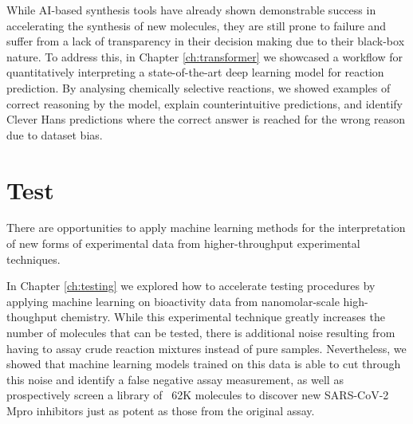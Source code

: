 


While AI-based synthesis tools have already shown demonstrable success in accelerating the synthesis of new molecules, they are still prone to failure and suffer from a lack of transparency in their decision making due to their black-box nature. To address this, in Chapter \ref{ch:transformer} we showcased a workflow for quantitatively interpreting a state-of-the-art deep learning model for reaction prediction. By analysing chemically selective reactions, we showed examples of correct reasoning by the model, explain counterintuitive predictions, and identify Clever Hans predictions where the correct answer is reached for the wrong reason due to dataset bias.

\section*{Test}

There are opportunities to apply machine learning methods for the interpretation of new forms of experimental data from higher-throughput experimental techniques.

In Chapter \ref{ch:testing} we explored how to accelerate testing procedures by applying machine learning on bioactivity data from nanomolar-scale high-thoughput chemistry. While this experimental technique greatly increases the number of molecules that can be tested, there is additional noise resulting from having to assay crude reaction mixtures instead of pure samples. Nevertheless, we showed that machine learning models trained on this data is able to cut through this noise and identify a false negative assay measurement, as well as prospectively screen a library of ~62K molecules to discover new SARS-CoV-2 Mpro inhibitors just as potent as those from the original assay.


